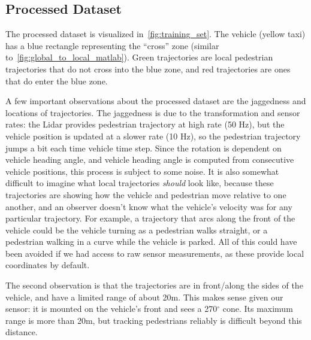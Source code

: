 \subsection{Processed Dataset}

The processed dataset is visualized in~\cref{fig:training_set}.
The vehicle (yellow taxi) has a blue rectangle representing the ``cross'' zone (similar to~\cref{fig:global_to_local_matlab}).
Green trajectories are local pedestrian trajectories that do not cross into the blue zone, and red trajectories are ones that do enter the blue zone.

A few important observations about the processed dataset are the jaggedness and locations of trajectories.
The jaggedness is due to the transformation and sensor rates: the Lidar provides pedestrian trajectory at high rate (50 Hz), but the vehicle position is updated at a slower rate (10 Hz), so the pedestrian trajectory jumps a bit each time vehicle time step.
Since the rotation is dependent on vehicle heading angle, and vehicle heading angle is computed from consecutive vehicle positions, this process is subject to some noise.
It is also somewhat difficult to imagine what local trajectories \textit{should} look like, because these trajectories are showing how the vehicle and pedestrian move relative to one another, and an observer doesn't know what the vehicle's velocity was for any particular trajectory.
For example, a trajectory that arcs along the front of the vehicle could be the vehicle turning as a pedestrian walks straight, or a pedestrian walking in a curve while the vehicle is parked.
All of this could have been avoided if we had access to raw sensor measurements, as these provide local coordinates by default.

The second observation is that the trajectories are in front/along the sides of the vehicle, and have a limited range of about 20m.
This makes sense given our sensor: it is mounted on the vehicle's front and sees a 270$^{\circ}$ cone.
Its maximum range is more than 20m, but tracking pedestrians reliably is difficult beyond this distance.

